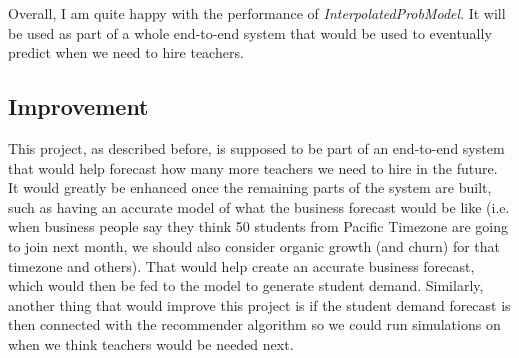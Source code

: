 \documentclass[oneside]{article}
\begin{document}
Overall, I am quite happy with the performance of \emph{InterpolatedProbModel}.
It will be used as part of a whole end-to-end system that would be used to
eventually predict when we need to hire teachers.

\subsection{Improvement}

This project, as described before, is supposed to be part of an end-to-end
system that would help forecast how many more teachers we need to hire in the
future. It would greatly be enhanced once the remaining parts of the system are
built, such as having an accurate model of what the business forecast would be
like (i.e. when business people say they think 50 students from Pacific
Timezone are going to join next month, we should also consider organic growth
(and churn) for that timezone and others). That would help create an accurate
business forecast, which would then be fed to the model to generate student
demand. Similarly, another thing that would improve this project is if the
student demand forecast is then connected with the recommender algorithm so we
could run simulations on when we think teachers would be needed next.



\end{document}
